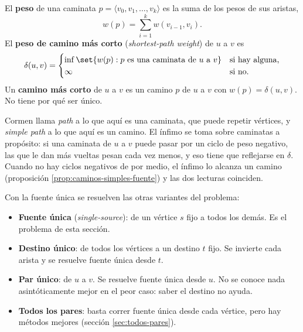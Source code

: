 \documentclass[11pt,letterpaper]{article}
\begin{document}
\begin{definicion}
  \label{def:distancia-fuente}
  El \textbf{peso} de una caminata
  $p = \langle v_0, v_1, \dots, v_k \rangle$ es la suma de los pesos
  de sus aristas,
  \[
    w(p) = \sum_{i=1}^{k} w(v_{i-1}, v_i) .
  \]
  El \textbf{peso de camino más corto} (\textit{shortest-path
  weight}) de $u$ a $v$ es
  \[
    \delta(u, v) =
    \begin{cases}
      \inf \set{w(p) : p \text{ es una caminata de } u
        \text{ a } v} & \text{si hay alguna,} \\
      \infty & \text{si no.}
    \end{cases}
  \]
  Un \textbf{camino más corto} de $u$ a $v$ es un camino $p$ de $u$ a
  $v$ con $w(p) = \delta(u, v)$. No tiene por qué ser único.
\end{definicion}

\begin{observacion}
  Cormen llama \textit{path} a lo que aquí es una caminata, que puede
  repetir vértices, y \textit{simple path} a lo que aquí es un camino.
  El ínfimo se toma sobre caminatas a propósito: si una caminata de
  $u$ a $v$ puede pasar por un ciclo de peso negativo, las que le dan
  más vueltas pesan cada vez menos, y eso tiene que reflejarse en
  $\delta$. Cuando no hay ciclos negativos de por medio, el ínfimo lo
  alcanza un camino (proposición \ref{prop:caminos-simples-fuente}) y
  las dos lecturas coinciden.
\end{observacion}

Con la fuente única se resuelven las otras variantes del problema:
\begin{itemize}[itemsep=0.1em]
  \item \textbf{Fuente única} (\textit{single-source}): de un vértice
        $s$ fijo a todos los demás. Es el problema de esta sección.
  \item \textbf{Destino único}: de todos los vértices a un destino
        $t$ fijo. Se invierte cada arista y se resuelve fuente única
        desde $t$.
  \item \textbf{Par único}: de $u$ a $v$. Se resuelve fuente única
        desde $u$. No se conoce nada asintóticamente mejor en el peor
        caso: saber el destino no ayuda.
  \item \textbf{Todos los pares}: basta correr fuente única desde
        cada vértice, pero hay métodos mejores (sección
        \ref{sec:todos-pares}).
\end{itemize}
\end{document}
